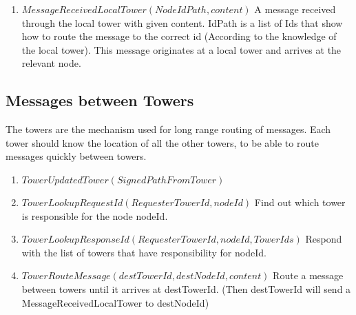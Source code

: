 \documentclass{amsart}
\theoremstyle{definition}
\theoremstyle{remark}
\numberwithin{equation}{section}
\begin{document}
\begin{enumerate}
  \item $MessageReceivedLocalTower(NodeIdPath, content)$
    A message received through the local tower with given content.
    IdPath is a list of Ids that show how to route the message to the correct
    id (According to the knowledge of the local tower).
    This message originates at a local tower and arrives at the relevant node.


\end{enumerate}

\subsection{Messages between Towers}

The towers are the mechanism used for long range routing of messages.
Each tower should know the location of all the other towers, to be able to route
messages quickly between towers.

\begin{enumerate}
  \item $TowerUpdatedTower(SignedPathFromTower)$
  \item $TowerLookupRequestId(RequesterTowerId, nodeId)$
    Find out which tower is responsible for the node nodeId.

  \item $TowerLookupResponseId(RequesterTowerId, nodeId, TowerIds)$
    Respond with the list of towers that have responsibility for nodeId.

  \item $TowerRouteMessage(destTowerId, destNodeId, content)$
    Route a message between towers until it arrives at destTowerId.
    (Then destTowerId will send a MessageReceivedLocalTower to destNodeId)
\end{enumerate}




\end{document}
